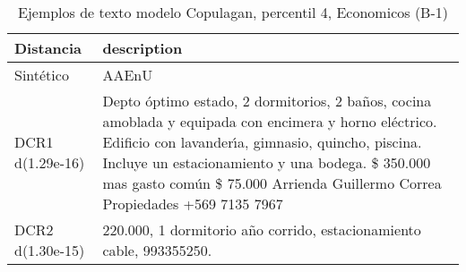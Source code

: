 \begin{table}[H]
\centering
\fontsize{10}{14}\selectfont
\caption{Ejemplos de texto modelo Copulagan, percentil 4, Economicos (B-1)}
\label{table-example-economicos-b-1-copulagan-4p-text}
\begin{tabular}{|l|m{35em}|}
\hline
\rowcolor[gray]{0.8}
Distancia & description \\
\hline Sintético & AAEnU \\
\hline DCR1 d(1.29e-16) & Depto \'optimo estado, 2 dormitorios, 2 ba\~nos, cocina amoblada y equipada con encimera y horno el\'ectrico. Edificio con lavander{\'\i}a, gimnasio, quincho, piscina. Incluye un estacionamiento y una bodega.
\$ 350.000 mas gasto com\'un \$ 75.000
Arrienda Guillermo Correa Propiedades
+569 7135 7967
  \\
\hline DCR2 d(1.30e-15) & 220.000, 1 dormitorio a\~no corrido, estacionamiento cable, 993355250. \\
\hline
\end{tabular}
\end{table}
